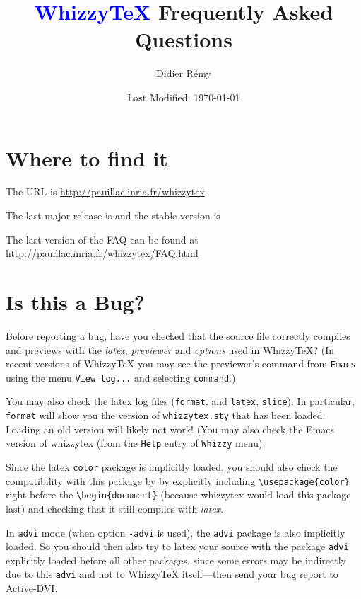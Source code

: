 \documentclass{article}
\title {\textcolor{blue}{WhizzyTeX}  Frequently Asked Questions}
\author {Didier R{\'{e}}my}
\date {Last Modified: \today}
\def \WhizzyTeX{Whizzy\TeX}
\begin{document}
\maketitle

\tableofcontents

\section {Where to find it}

The URL is \url{http://pauillac.inria.fr/whizzytex}

The last major release is {\release}
and the stable version is {\version}

The last version of the FAQ can be found at 
\url{http://pauillac.inria.fr/whizzytex/FAQ.html}

\hypertarget{isitabug}{}
\section {Is this a Bug?}

Before reporting a bug, have you checked that the source file correctly
compiles and previews with the \emph{latex}, \emph{previewer}
and \emph{options} used in {\WhizzyTeX}?
(In recent versions of {\WhizzyTeX} you may see the previewer's command from 
\texttt{Emacs} using the menu \texttt{View log...} and selecting
\texttt{command}.) 

You may also check the latex log files (\texttt{format}, and
\texttt{latex}, \texttt{slice}). In particular, \texttt{format} will show
you the version of \texttt{whizzytex.sty} that has been loaded. Loading an
old version will likely not work! (You may also check the Emacs version of
whizzytex (from the \texttt{Help} entry of \texttt{Whizzy} menu). 

Since the latex \texttt{color} package is implicitly loaded, you 
should also check the compatibility with this package by 
by explicitly including \verb"\usepackage{color}" right before the
\verb"\begin{document}" (because whizzytex would load this package last) 
and checking that it still compiles with \emph{latex}.

In \texttt{advi} mode (when option \texttt{-advi} is used), the
\texttt{advi} package is also implicitly loaded. So you should then also try
to latex your source with the package \texttt{advi} explicitly loaded before
all other packages, since some errors may be indirectly due to this
\texttt{advi} and not to {\WhizzyTeX} itself---then send your bug report
to \href{http://pauillac.inria.fr/advi/}{Active-DVI}.
\end{document}
